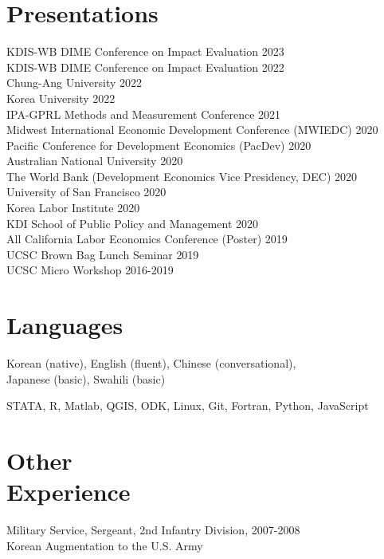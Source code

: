 \documentclass[letterpaper, margin, 10pt]{res} %
\newcommand{\blank}[1]{\hspace*{#1}\linebreak[0]}
\begin{document}
\begin{resume}
\section{Presentations}
KDIS-WB DIME Conference on Impact Evaluation  \hfill{2023}\\
KDIS-WB DIME Conference on Impact Evaluation  \hfill{2022}\\
Chung-Ang University  \hfill{2022}\\
Korea University  \hfill{2022}\\
IPA-GPRL Methods and Measurement Conference  \hfill{2021}\\
Midwest International Economic Development Conference (MWIEDC)  \hfill{2020}\\
Pacific Conference for Development Economics (PacDev) \hfill{2020}\\
Australian National University \hfill{2020}\\
The World Bank (Development Economics Vice Presidency, DEC) \hfill{2020}\\
University of San Francisco \hfill{2020}\\
Korea Labor Institute \hfill{2020}\\
KDI School of Public Policy and Management \hfill{2020}\\
All California Labor Economics Conference (Poster)   \hfill{2019}\\
UCSC Brown Bag Lunch Seminar  \hfill{2019}\\
UCSC Micro Workshop \hfill{2016-2019}



\section{\sc \textbf{Languages}}
Korean (native), English (fluent), Chinese (conversational), \\ Japanese (basic), Swahili (basic)

STATA, R, Matlab, QGIS, ODK, Linux, Git, Fortran, Python, JavaScript

\section{\sc \textbf{Other \\ Experience}}
Military Service, Sergeant, 2nd Infantry Division, \hfill{2007-2008} \\
\blank{0.5cm} Korean Augmentation to the U.S. Army


\end{resume}
\end{document}
